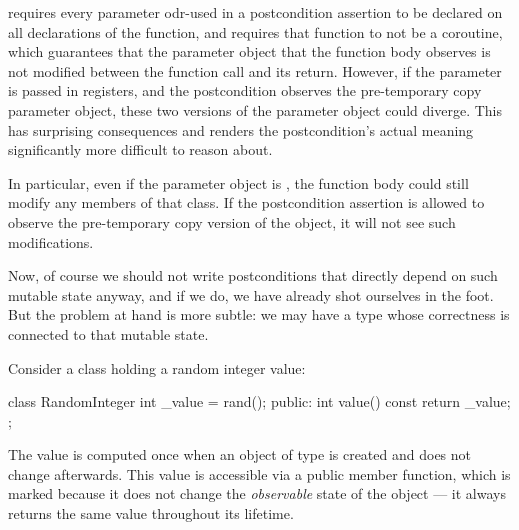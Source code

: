 \cite{P2900R10} requires every parameter odr-used in a postcondition assertion  to be declared  on all declarations of the function, and requires that function to not be a coroutine, which guarantees that the parameter object that the function body observes is not modified between the function call and its return. However, if the parameter is passed in registers, and the postcondition observes the pre-temporary copy parameter object, these two versions of the parameter object could diverge. This has surprising consequences and renders the postcondition's actual meaning significantly more difficult to reason about. 

In particular, even if the parameter object is , the function body could still modify any  members of that class. If the postcondition assertion is allowed to observe the pre-temporary copy version of the object, it will not see such modifications.

Now, of course we should not write postconditions that directly depend on such mutable state anyway, and if we do, we have already shot ourselves in the foot. But the problem at hand is more subtle: we may have a type whose correctness is connected to that mutable state.

Consider a class  holding a random integer value:

\begin{codeblock}
class RandomInteger {
  int _value = rand();
public:
  int value() const { 
    return _value; 
  }
};
\end{codeblock}

The value is computed once when an object of type  is created and does not change afterwards. This value is accessible via a public  member function, which is marked  because it does not change the \emph{observable} state of the object --- it always returns the same value throughout its lifetime.

